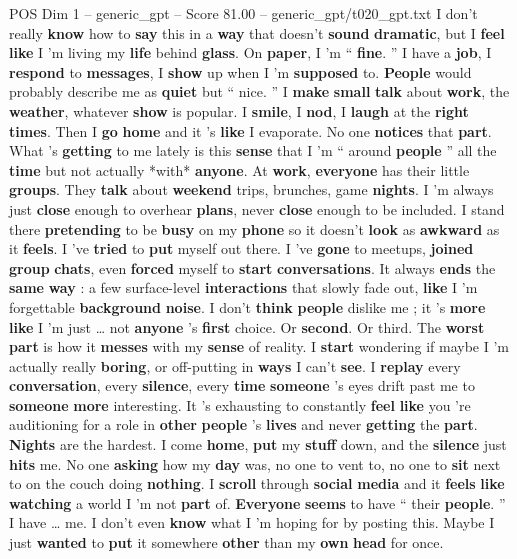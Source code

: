 \begin{textsample}{POS Dim 1 – generic\_gpt – Score 81.00 – generic\_gpt/t020\_gpt.txt}  \label{ex:f1_pos_010}
I don't really \textbf{know} how to \textbf{say} this in a \textbf{way} that doesn't \textbf{sound} \textbf{dramatic}, but I \textbf{feel} \textbf{like} I ’m living my \textbf{life} behind \textbf{glass}.
On \textbf{paper}, I ’m “ \textbf{fine}. ” I have a \textbf{job}, I \textbf{respond} to \textbf{messages}, I \textbf{show} up when I ’m \textbf{supposed} to. \textbf{People} would probably describe me as \textbf{quiet} but “ nice. ” I \textbf{make} \textbf{small} \textbf{talk} about \textbf{work}, the \textbf{weather}, whatever \textbf{show} is popular.
I \textbf{smile}, I \textbf{nod}, I \textbf{laugh} at the \textbf{right} \textbf{times}.
Then I \textbf{go} \textbf{home} and it ’s \textbf{like} I evaporate.
No one \textbf{notices} that \textbf{part}.
What ’s \textbf{getting} to me lately is this \textbf{sense} that I ’m “ around \textbf{people} ” all the \textbf{time} but not actually *with* \textbf{anyone}.
At \textbf{work}, \textbf{everyone} has their little \textbf{groups}.
They \textbf{talk} about \textbf{weekend} trips, brunches, game \textbf{nights}.
I ’m always just \textbf{close} enough to overhear \textbf{plans}, never \textbf{close} enough to be included.
I stand there \textbf{pretending} to be \textbf{busy} on my \textbf{phone} so it doesn't \textbf{look} as \textbf{awkward} as it \textbf{feels}.
I ’ve \textbf{tried} to \textbf{put} myself out there.
I ’ve \textbf{gone} to meetups, \textbf{joined} \textbf{group} \textbf{chats}, even \textbf{forced} myself to \textbf{start} \textbf{conversations}.
It always \textbf{ends} the \textbf{same} \textbf{way} : a few surface-level \textbf{interactions} that slowly fade out, \textbf{like} I ’m forgettable \textbf{background} \textbf{noise}.
I don't \textbf{think} \textbf{people} dislike me ; it ’s \textbf{more} \textbf{like} I ’m just … not \textbf{anyone} ’s \textbf{first} choice.
Or \textbf{second}.
Or third.
The \textbf{worst} \textbf{part} is how it \textbf{messes} with my \textbf{sense} of reality.
I \textbf{start} wondering if maybe I ’m actually really \textbf{boring}, or off-putting in \textbf{ways} I can't \textbf{see}.
I \textbf{replay} every \textbf{conversation}, every \textbf{silence}, every \textbf{time} \textbf{someone} ’s eyes drift past me to \textbf{someone} \textbf{more} interesting.
It ’s exhausting to constantly \textbf{feel} \textbf{like} you ’re auditioning for a role in \textbf{other} \textbf{people} ’s \textbf{lives} and never \textbf{getting} the \textbf{part}. \textbf{Nights} are the hardest.
I come \textbf{home}, \textbf{put} my \textbf{stuff} down, and the \textbf{silence} just \textbf{hits} me.
No one \textbf{asking} how my \textbf{day} was, no one to vent to, no one to \textbf{sit} next to on the couch doing \textbf{nothing}.
I \textbf{scroll} through \textbf{social} \textbf{media} and it \textbf{feels} \textbf{like} \textbf{watching} a world I ’m not \textbf{part} of. \textbf{Everyone} \textbf{seems} to have “ their \textbf{people}. ” I have … me.
I don't even \textbf{know} what I ’m hoping for by posting this.
Maybe I just \textbf{wanted} to \textbf{put} it somewhere \textbf{other} than my \textbf{own} \textbf{head} for once.


\end{textsample}
